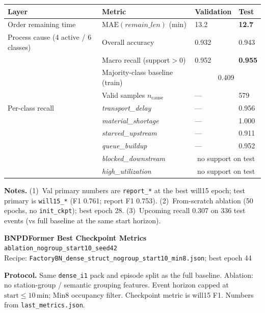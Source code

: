 \documentclass[10pt,a4paper]{article}
\begin{document}
\begin{center}
\begin{tabular}{l l l l}
\toprule
Layer & Metric & Validation & Test \\
\midrule
Order remaining time
  & $\mathrm{MAE}(\textit{remain\_len})$ (min)
  & 13.2
  & \textbf{12.7} \\
\midrule
Process cause (4 active / 6 classes)
  & Overall accuracy
  & 0.932
  & 0.943 \\
  & Macro recall (support${>}0$)
  & 0.952
  & \textbf{0.955} \\
  & Majority-class baseline (train)
  & \multicolumn{2}{c}{0.409} \\
  & Valid samples $n_{\mathrm{cause}}$
  & ---
  & 579 \\
\midrule
Per-class recall
  & \textit{transport\_delay}
  & --- & 0.956 \\
  & \textit{material\_shortage}
  & --- & 1.000 \\
  & \textit{starved\_upstream}
  & --- & 0.911 \\
  & \textit{queue\_buildup}
  & --- & 0.952 \\
  & \textit{blocked\_downstream}
  & \multicolumn{2}{c}{no support on test} \\
  & \textit{high\_utilization}
  & \multicolumn{2}{c}{no support on test} \\
\bottomrule
\end{tabular}
\end{center}

\small
\textbf{Notes.}
(1)~Val primary numbers are \texttt{report\_*} at the best will15 epoch; test primary is \texttt{will15\_*} (F1 0.761; report F1 0.753).
(2)~From-scratch ablation (50 epochs, no \texttt{init\_ckpt}); best epoch 28.
(3)~Upcoming recall 0.307 on 336 test events (vs full baseline at the same start horizon).

\clearpage
\begin{center}
{\LARGE\bfseries BNPDFormer Best Checkpoint Metrics}\\[3pt]
{\large\texttt{ablation\_nogroup\_start10\_seed42}}\\[2pt]
{\normalsize Recipe: \texttt{FactoryBN\_dense\_struct\_nogroup\_start10\_min8.json}; best epoch 44}
\end{center}

\textbf{Protocol.}
Same \texttt{dense\_i1} pack and episode split as the full baseline.
Ablation: no station-group / semantic grouping features.
Event horizon capped at $\mathrm{start}\le 10$\,min; Min8 occupancy filter.
Checkpoint metric is will15 F1.
Numbers from \texttt{last\_metrics.json}.
\end{document}
